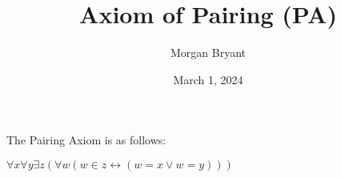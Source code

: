 \documentclass[a4paper]{article}
\title{Axiom of Pairing (PA)}
\date{March 1, 2024}
\author{Morgan Bryant}
\begin{document}
\maketitle
\par{The Pairing Axiom is as follows:}\par{\(\forall  x  \forall  y  \exists  z ( \forall  w(w \in  z  \leftrightarrow  (w= x \lor  w=y)))\)}
\printbibliography
\end{document}
